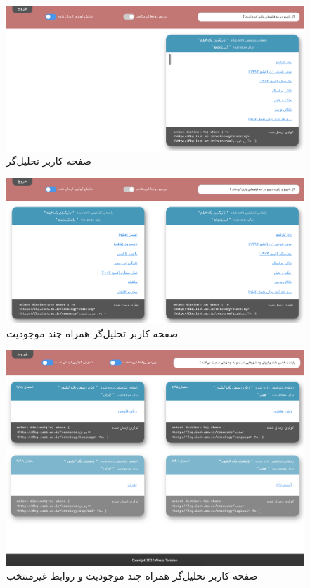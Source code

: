 \begin{figure}
	\centering
	\includegraphics[width=15cm]{figures/interface/admin.png}
	\caption{صفحه کاربر تحلیل‌گر}
\end{figure}

\begin{figure}
	\centering
	\includegraphics[width=15cm]{figures/interface/admin-multiple-ent.png}
	\caption{صفحه کاربر تحلیل‌گر همراه چند موجودیت}
\end{figure}

\begin{figure}
	\centering
	\includegraphics[width=15cm]{figures/interface/admin-double-multiple.png}
	\caption{صفحه کاربر تحلیل‌گر همراه چند موجودیت و روابط غیرمنتخب}
\end{figure}